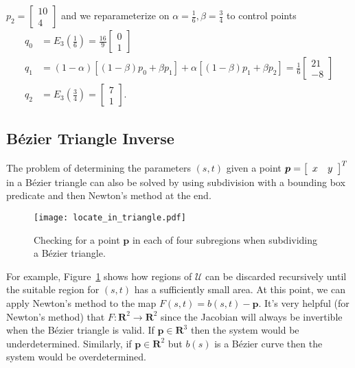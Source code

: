 \documentclass[oneside, reqno]{amsart}
\theoremstyle{definition}
\newcommand{\reals}{\mathbf{R}}
\newcommand{\utri}{\mathcal{U}}
\begin{document}
\(p_2 = \left[ \begin{array}{c} 10 \\ 4 \end{array}\right]\)
and we reparameterize on \(\alpha = \frac{1}{6}, \beta = \frac{3}{4}\) to
control points
\begin{align}
  q_0 &= E_3\left(\frac{1}{6}\right) =
  \frac{16}{9} \left[ \begin{array}{c} 0 \\ 1 \end{array}\right] \\
  q_1 &= (1 - \alpha) \left[(1 - \beta) p_0 + \beta p_1\right] +
   \alpha \left[(1 - \beta) p_1 + \beta p_2\right] = \frac{1}{6} \left[
    \begin{array}{c} 21 \\ -8 \end{array}\right] \\
  q_2 &= E_3\left(\frac{3}{4}\right) = \left[
    \begin{array}{c} 7 \\ 1 \end{array}\right].
\end{align}

\subsection{B\'{e}zier Triangle Inverse}

The problem of determining the parameters \((s, t)\) given a point
\(\bm{p} = \left[\begin{array}{c c} x & y\end{array}\right]^T\)
in a B\'{e}zier triangle can also be solved by using
subdivision with a bounding box predicate and then Newton's method
at the end.

\begin{figure}
  \texttt{[image: locate\_in\_triangle.pdf]}
  \centering
  \captionsetup{width=.75\linewidth}
  \caption{Checking for a point \(\bm{p}\) in each of four subregions
    when subdividing a B\'{e}zier triangle.}
  \label{fig:locate-in-triangle}
\end{figure}

For example, Figure~\ref{fig:locate-in-triangle} shows
how regions of \(\utri\) can be discarded recursively until the
suitable region for \((s, t)\) has a sufficiently small area. At
this point, we can apply Newton's method to the map \(F(s, t) =
b(s, t) - \bm{p}\). It's very helpful (for Newton's method) that
\(F: \reals^2 \longrightarrow \reals^2\) since the Jacobian will
always be invertible
when the B\'{e}zier triangle is valid. If \(\bm{p} \in \reals^3\)
then the system would be underdetermined. Similarly, if
\(\bm{p} \in \reals^2\) but \(b(s)\) is a B\'{e}zier curve then the
system would be overdetermined.
\end{document}
